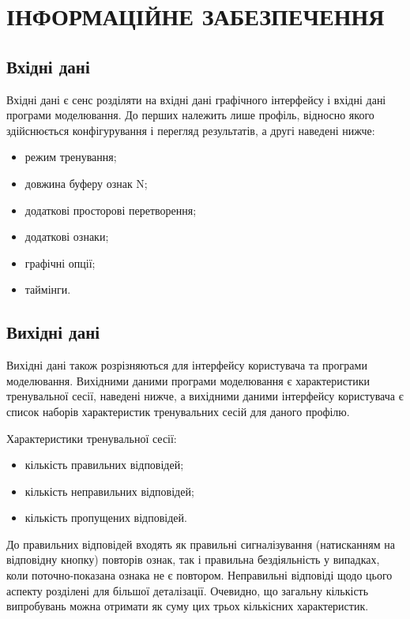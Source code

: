 \section{ІНФОРМАЦІЙНЕ ЗАБЕЗПЕЧЕННЯ}
\subsection{Вхідні дані}

Вхідні дані є сенс розділяти на вхідні дані графічного інтерфейсу і вхідні дані програми моделювання. До перших належить лише профіль, відносно якого здійснюється конфігурування і перегляд результатів, а другі наведені нижче:

\begin{itemize}
  \item режим тренування;
  \item довжина буферу ознак N;
  \item додаткові просторові перетворення;
  \item додаткові ознаки;
  \item графічні опції;
  \item таймінги.
\end{itemize}

\subsection{Вихідні дані}

Вихідні дані також розрізняються для інтерфейсу користувача та програми моделювання. Вихідними даними програми моделювання є характеристики тренувальної сесії, наведені нижче, а вихідними даними інтерфейсу користувача є список наборів характеристик тренувальних сесій для даного профілю.

Характеристики тренувальної сесії:
\begin{itemize}
  \item кількість правильних відповідей;
  \item кількість неправильних відповідей;
  \item кількість пропущених відповідей.
\end{itemize}

До правильних відповідей входять як правильні сигналізування (натисканням на відповідну кнопку) повторів ознак, так і правильна бездіяльність у випадках, коли поточно-показана ознака не є повтором. Неправильні відповіді щодо цього аспекту розділені для більшої деталізації. Очевидно, що загальну кількість випробувань можна отримати як суму цих трьох кількісних характеристик.

